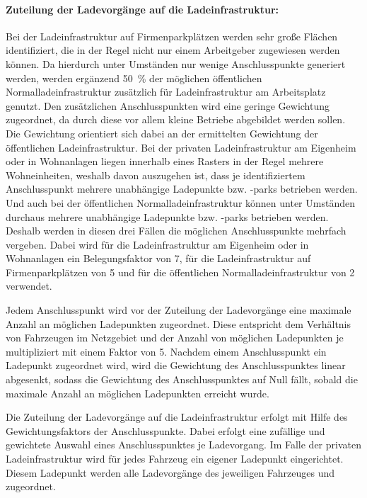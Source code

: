 \paragraph{Zuteilung der Ladevorgänge auf die Ladeinfrastruktur:}

Bei der Ladeinfrastruktur auf Firmenparkplätzen werden sehr große Flächen identifiziert, die in der Regel nicht nur einem Arbeitgeber zugewiesen werden können.
Da hierdurch unter Umständen nur wenige Anschlusspunkte generiert werden, werden ergänzend \SI{50}{\percent} der möglichen öffentlichen Normalladeinfrastruktur zusätzlich für Ladeinfrastruktur am Arbeitsplatz genutzt.
Den zusätzlichen Anschlusspunkten wird eine geringe Gewichtung zugeordnet, da durch diese vor allem kleine Betriebe abgebildet werden sollen.
Die Gewichtung orientiert sich dabei an der ermittelten Gewichtung der öffentlichen Ladeinfrastruktur.
Bei der privaten Ladeinfrastruktur am Eigenheim oder in Wohnanlagen liegen innerhalb eines Rasters in der Regel mehrere Wohneinheiten, weshalb davon auszugehen ist, dass je identifiziertem Anschlusspunkt mehrere unabhängige Ladepunkte bzw. -parks betrieben werden.
Und auch bei der öffentlichen Normalladeinfrastruktur können unter Umständen durchaus mehrere unabhängige Ladepunkte bzw. -parks betrieben werden.
Deshalb werden in diesen drei Fällen die möglichen Anschlusspunkte mehrfach vergeben.
Dabei wird für die Ladeinfrastruktur am Eigenheim oder in Wohnanlagen ein Belegungsfaktor von \num{7}, für die Ladeinfrastruktur auf Firmenparkplätzen von \num{5} und für die öffentlichen Normalladeinfrastruktur von \num{2} verwendet.\medskip

Jedem Anschlusspunkt wird vor der Zuteilung der Ladevorgänge eine maximale Anzahl an möglichen Ladepunkten zugeordnet.
Diese entspricht dem Verhältnis von Fahrzeugen im Netzgebiet und der Anzahl von möglichen Ladepunkten je \UC multipliziert mit einem Faktor von \num{5}.
Nachdem einem Anschlusspunkt ein Ladepunkt zugeordnet wird, wird die Gewichtung des Anschlusspunktes linear abgesenkt, sodass die Gewichtung des Anschlusspunktes auf Null fällt, sobald die maximale Anzahl an möglichen Ladepunkten erreicht wurde.\medskip

Die Zuteilung der Ladevorgänge auf die Ladeinfrastruktur erfolgt mit Hilfe des Gewichtungsfaktors der Anschlusspunkte.
Dabei erfolgt eine zufällige und gewichtete Auswahl eines Anschlusspunktes je Ladevorgang.
Im Falle der privaten Ladeinfrastruktur wird für jedes Fahrzeug ein eigener Ladepunkt eingerichtet.
Diesem Ladepunkt werden alle Ladevorgänge des jeweiligen Fahrzeuges und \UCs zugeordnet.\medskip

